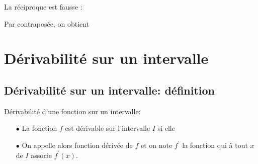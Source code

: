 \documentclass[a4paper, 11pt]{article}
\begin{document}
\noindent \warning  La r\'eciproque est fausse : \dotfill



\begin{rem} Par contrapos\'ee, on obtient \dotfill
\end{rem}



\section{D\'erivabilit\'e sur un intervalle}

\subsection{D\'erivabilit\'e sur un intervalle: d\'efinition}


{\noindent

	\begin{defi} D\'erivabilit\'e d'une fonction sur un intervalle:
		\begin{itemize}
			\item[$\bullet$] La fonction $f$ est d\'erivable sur l'intervalle $I$ si elle \dotfill
			\item[$\bullet$] On appelle alors fonction d\'eriv\'ee de $f$ et on note $f^{\prime}$ la fonction qui \`a tout $x$ de $I$ associe $f^{\prime}(x)$.
		\end{itemize}
	\end{defi}

}
\end{document}
